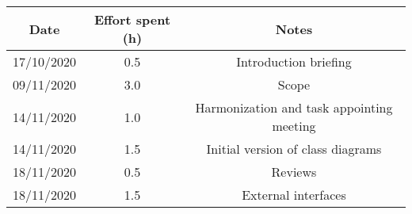 \documentclass[../../main.tex]{subfiles}
\begin{document}
\begin{center}
    \begin{tabular}{|c| |c| |c|} 
        \hline
        Date & Effort spent (h) & Notes\\ [0.5ex] 
        \hline\hline
        17/10/2020 & 0.5 & Introduction briefing\\ 
        09/11/2020 & 3.0 & Scope\\ 
        14/11/2020 & 1.0 & Harmonization and task appointing meeting\\
        14/11/2020 & 1.5 & Initial version of class diagrams\\
        18/11/2020 & 0.5 & Reviews\\
        18/11/2020 & 1.5 & External interfaces\\
        \hline
    \end{tabular}
\end{center}
\end{document}
